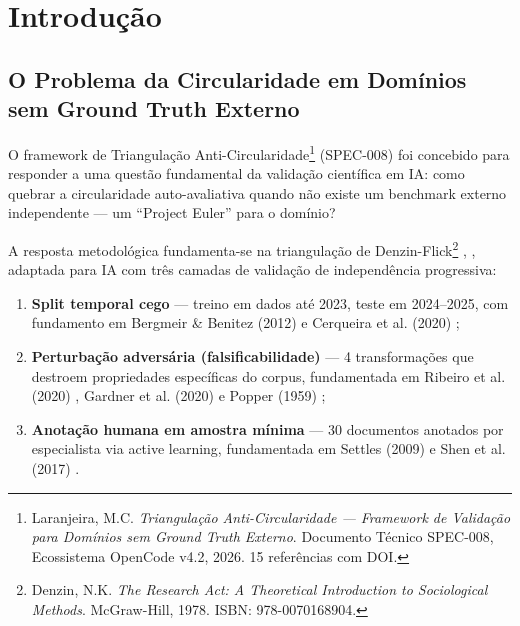\documentclass[12pt,a4paper]{article}
\theoremstyle{remark}
\begin{document}
\newpage
\tableofcontents
\newpage

\section{Introdução}

\subsection{O Problema da Circularidade em Domínios sem Ground Truth Externo}

O framework de Triangulação Anti-Circularidade\footnote{Laranjeira, M.C. \textit{Triangulação Anti-Circularidade — Framework de Validação para Domínios sem Ground Truth Externo}. Documento Técnico SPEC-008, Ecossistema OpenCode v4.2, 2026. 15 referências com DOI.} (SPEC-008) foi concebido para responder a uma questão fundamental da validação científica em IA: como quebrar a circularidade auto-avaliativa quando não existe um benchmark externo independente — um ``Project Euler'' para o domínio?

A resposta metodológica fundamenta-se na triangulação de Denzin-Flick\footnote{Denzin, N.K. \textit{The Research Act: A Theoretical Introduction to Sociological Methods}. McGraw-Hill, 1978. ISBN: 978-0070168904.} \cite{denzin1978}, \cite{flick2018}, adaptada para IA com três camadas de validação de independência progressiva:

\begin{enumerate}[label=C\arabic*:, nosep]
  \item \textbf{Split temporal cego} — treino em dados até 2023, teste em 2024--2025, com fundamento em Bergmeir \& Benitez (2012) \cite{bergmeir2012} e Cerqueira et al. (2020) \cite{cerqueira2020};
  \item \textbf{Perturbação adversária (falsificabilidade)} — 4 transformações que destroem propriedades específicas do corpus, fundamentada em Ribeiro et al. (2020) \cite{ribeiro2020}, Gardner et al. (2020) \cite{gardner2020} e Popper (1959) \cite{popper1959};
  \item \textbf{Anotação humana em amostra mínima} — 30 documentos anotados por especialista via active learning, fundamentada em Settles (2009) \cite{settles2009} e Shen et al. (2017) \cite{shen2017}.
\end{enumerate}
\end{document}
